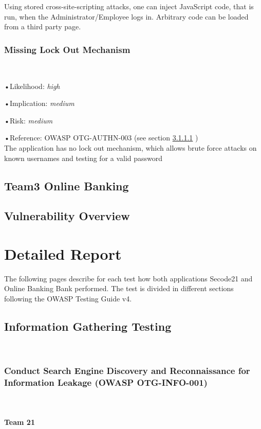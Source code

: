 \documentclass[headsepline,footsepline,footinclude=false,oneside,fontsize=11pt,paper=a4,listof=totoc,bibliography=totoc]{scrbook} %
\begin{document}
Using stored cross-site-scripting attacks, one can inject JavaScript code, that is run, when the Administrator/Employee logs in. Arbitrary code can be loaded from a third party page.

\subsection{Missing Lock Out Mechanism}\label{Missing Lock Out Mechanism}\

	•Likelihood: \textit{high}\
	
	•Implication: \textit{medium}\
	
	•Risk: \textit{medium}\
	
	•Reference: OWASP OTG-AUTHN-003 (see section \ref{} )\\
	
The application has no lock out mechanism, which allows brute force attacks on known usernames and testing
for a valid password

\section{Team3 Online Banking}

\section{Vulnerability Overview}

\chapter{Detailed Report}

The following pages describe for each test how both applications Secode21 and Online Banking Bank
performed. The test is divided in different sections following the OWASP Testing Guide v4.

\pagebreak 

\section{Information Gathering Testing}\

\subsection{Conduct Search Engine Discovery and Reconnaissance for Information Leakage (OWASP OTG-INFO-001)}\

\subsubsection{Team 21}
\end{document}
